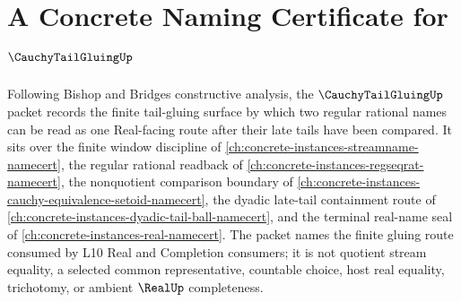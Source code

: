 \chapter{A Concrete Naming Certificate for $\CauchyTailGluingUp$}
\label{ch:concrete-instances-cauchy-tail-gluing-namecert}

Following Bishop and Bridges constructive analysis, the $\CauchyTailGluingUp$ packet records the finite tail-gluing surface by which two regular rational names can be read as one Real-facing route after their late tails have been compared. It sits over the finite window discipline of \autoref{ch:concrete-instances-streamname-namecert}, the regular rational readback of \autoref{ch:concrete-instances-regseqrat-namecert}, the nonquotient comparison boundary of \autoref{ch:concrete-instances-cauchy-equivalence-setoid-namecert}, the dyadic late-tail containment route of \autoref{ch:concrete-instances-dyadic-tail-ball-namecert}, and the terminal real-name seal of \autoref{ch:concrete-instances-real-namecert}. The packet names the finite gluing route consumed by L10 Real and Completion consumers; it is not quotient stream equality, a selected common representative, countable choice, host real equality, trichotomy, or ambient $\RealUp$ completeness.

